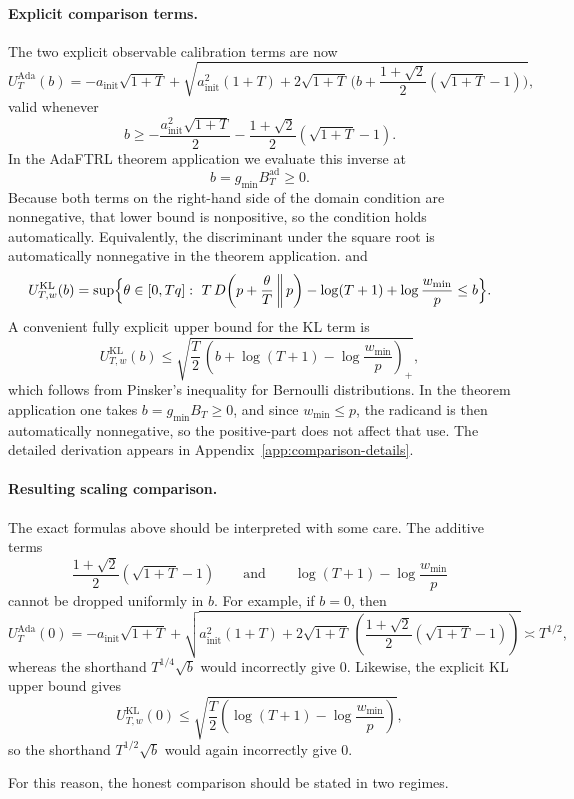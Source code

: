 \documentclass[11pt]{article}
\newcommand{\1}{\mathbf{1}}
\begin{document}
\paragraph{Explicit comparison terms.}
The two explicit observable calibration terms are now
\[
U_T^{\mathrm{Ada}}(b)
=
-a_{\mathrm{init}}\sqrt{1+T}
+
\sqrt{
a_{\mathrm{init}}^2(1+T)
+
2\sqrt{1+T}\,\bigl(b+\frac{1+\sqrt{2}}{2}(\sqrt{1+T}-1)\bigr)
},
\]
valid whenever
\[
b\ge -\frac{a_{\mathrm{init}}^2\sqrt{1+T}}{2}-\frac{1+\sqrt{2}}{2}(\sqrt{1+T}-1).
\]
In the AdaFTRL theorem application we evaluate this inverse at
\[
b=g_{\min}B_T^{\mathrm{ad}}\ge 0.
\]
Because both terms on the right-hand side of the domain condition are nonnegative, that lower bound is nonpositive, so the condition holds automatically. Equivalently, the discriminant under the square root is automatically nonnegative in the theorem application.
and
\[
U_{T,w}^{\mathrm{KL}}(b)
=
\sup\Bigl\{
\theta\in[0,Tq]:
\ T\,D\!\left(p+\frac{\theta}{T}\,\middle\|\,p\right)-\log(T+1)+\log\frac{w_{\min}}{p}\le b
\Bigr\}.
\]
A convenient fully explicit upper bound for the KL term is
\[
U_{T,w}^{\mathrm{KL}}(b)
\le
\sqrt{\frac{T}{2}\,\left(b+\log(T+1)-\log\frac{w_{\min}}{p}\right)_+},
\]
which follows from Pinsker's inequality for Bernoulli distributions. In the theorem application one takes $b=g_{\min}B_T\ge 0$, and since $w_{\min}\le p$, the radicand is then automatically nonnegative, so the positive-part does not affect that use. The detailed derivation appears in Appendix~\ref{app:comparison-details}.

\paragraph{Resulting scaling comparison.}
The exact formulas above should be interpreted with some care. The additive terms
\[
\frac{1+\sqrt{2}}{2}(\sqrt{1+T}-1)
\qquad\text{and}\qquad
\log(T+1)-\log\frac{w_{\min}}{p}
\]
cannot be dropped uniformly in \(b\). For example, if \(b=0\), then
\[
U_T^{\mathrm{Ada}}(0)
=
-a_{\mathrm{init}}\sqrt{1+T}
+
\sqrt{
a_{\mathrm{init}}^2(1+T)
+
2\sqrt{1+T}\,(\frac{1+\sqrt{2}}{2}(\sqrt{1+T}-1))
}
\asymp T^{1/2},
\]
whereas the shorthand \(T^{1/4}\sqrt{b}\) would incorrectly give \(0\). Likewise, the explicit KL upper bound gives
\[
U_{T,w}^{\mathrm{KL}}(0)
\le
\sqrt{\frac{T}{2}\left(\log(T+1)-\log\frac{w_{\min}}{p}\right)},
\]
so the shorthand \(T^{1/2}\sqrt{b}\) would again incorrectly give \(0\).

For this reason, the honest comparison should be stated in two regimes.
\end{document}
